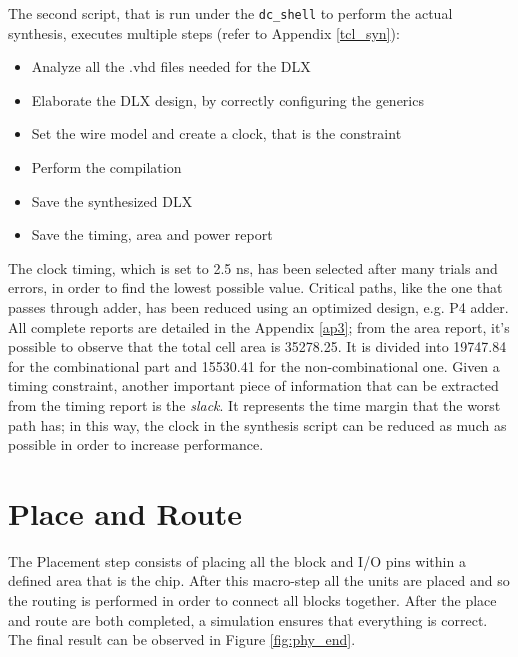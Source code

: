 The second script, that is run under the \texttt{dc\_shell} to perform the actual synthesis, executes multiple steps (refer to Appendix \ref{tcl_syn}):
\begin{itemize}
	\itemsep0sp
	\item Analyze all the .vhd files needed for the DLX
	\item Elaborate the DLX design, by correctly configuring the generics
	\item Set the wire model and create a clock, that is the constraint
	\item Perform the compilation
	\item Save the synthesized DLX
	\item Save the timing, area and power report 
\end{itemize}
The clock timing, which is set to 2.5 ns, has been selected after many trials and errors, in order to find the lowest possible value. Critical paths, like the one that passes through adder, has been reduced using an optimized design, e.g. P4 adder.\newline\newline
All complete reports are detailed in the Appendix \ref{ap3}; from the area report, it's possible to observe that the total cell area is 35278.25. It is divided into 19747.84 for the combinational part and 15530.41 for the non-combinational one.\newline\newline
Given a timing constraint, another important piece of information that can be extracted from the timing report is the \textit{slack}. It represents the time margin that the worst path has; in this way, the clock in the synthesis script can be reduced as much as possible in order to increase performance.

\section{Place and Route}
The Placement step consists of placing all the block and I/O pins within a defined area that is the chip. After this macro-step all the units are placed and so the routing is performed in order to connect all blocks together. After the place and route are both completed, a simulation ensures that everything is correct. The final result can be observed in Figure \ref{fig:phy_end}.


